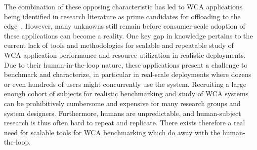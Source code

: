 The combination of these opposing characteristic has led to \ac{WCA} applications being identified in research literature as prime candidates for offloading to the edge~\cite{Ha2014towards,Chen2017Empirical,Chen2018application}.
However, many unknowns still remain before consumer-scale adoption of these applications can become a reality.
One key gap in knowledge pertains to the current lack of tools and methodologies for scalable and repeatable study of \ac{WCA} application performance and resource utilization in realistic deployments.
Due to their human-in-the-loop nature, these applications present a challenge to benchmark and characterize, in particular in real-scale deployments where dozens or even hundreds of users might concurrently use the system.
Recruiting a large enough cohort of subjects for realistic benchmarking and study of \ac{WCA} systems can be prohibitively cumbersome and expensive for many research groups and system designers.
Furthermore, humans are unpredictable, and human-subject research is thus often hard to repeat and replicate.
There exists therefore a real need for scalable tools for \ac{WCA} benchmarking which do away with the human-the-loop.

\medskip

